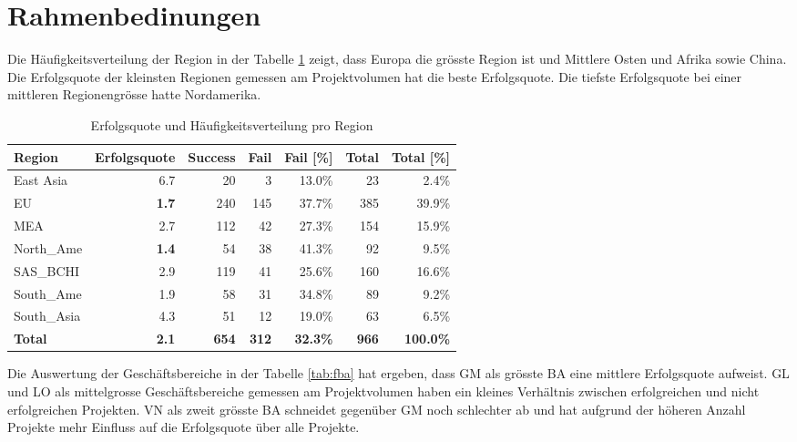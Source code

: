 \section{Rahmenbedinungen}
Die Häufigkeitsverteilung der Region in der Tabelle \ref{tab:freg} zeigt, dass Europa die grösste Region ist und Mittlere Osten und Afrika sowie China. Die Erfolgsquote der kleinsten Regionen gemessen am Projektvolumen hat die beste Erfolgsquote. Die tiefste Erfolgsquote bei einer mittleren Regionengrösse hatte Nordamerika.
\begin{table}[H]
	\centering
	\caption{Erfolgsquote und Häufigkeitsverteilung pro Region}
	\begin{tabular}{lrrrrrr}
		\toprule
		\textbf{Region} & \multicolumn{1}{l}{\textbf{Erfolgsquote}} & \multicolumn{1}{l}{\textbf{Success}} & \multicolumn{1}{l}{\textbf{Fail}} & \multicolumn{1}{l}{\textbf{Fail [\%]}} & \multicolumn{1}{l}{\textbf{Total}} & \multicolumn{1}{l}{\textbf{Total [\%]}} \\
		\midrule
		East Asia & 6.7   & 20    & 3     & 13.0\% & 23    & 2.4\% \\
		EU    & \textbf{1.7}   & 240   & 145   & 37.7\% & 385   & 39.9\% \\
		MEA & 2.7   & 112   & 42    & 27.3\% & 154   & 15.9\% \\
		North\_Ame & \textbf{1.4}   & 54    & 38    & 41.3\% & 92    & 9.5\% \\
		SAS\_BCHI & 2.9   & 119   & 41    & 25.6\% & 160   & 16.6\% \\
		South\_Ame & 1.9   & 58    & 31    & 34.8\% & 89    & 9.2\% \\
		South\_Asia & 4.3   & 51    & 12    & 19.0\% & 63    & 6.5\% \\ 
		\bottomrule
		\textbf{Total} & \textbf{2.1} & \textbf{654} & \textbf{312} & \textbf{32.3\%} & \textbf{966} & \textbf{100.0\%} \\
	\end{tabular}%
	\label{tab:freg}%
\end{table}%
Die Auswertung der Geschäftsbereiche in der Tabelle \ref{tab:fba} hat ergeben, dass GM als grösste BA eine mittlere Erfolgsquote aufweist. GL und LO als mittelgrosse Geschäftsbereiche gemessen am Projektvolumen haben ein kleines Verhältnis zwischen erfolgreichen und nicht erfolgreichen Projekten. VN als zweit grösste BA schneidet gegenüber GM noch schlechter ab und hat aufgrund der höheren Anzahl Projekte mehr Einfluss auf die Erfolgsquote über alle Projekte.

